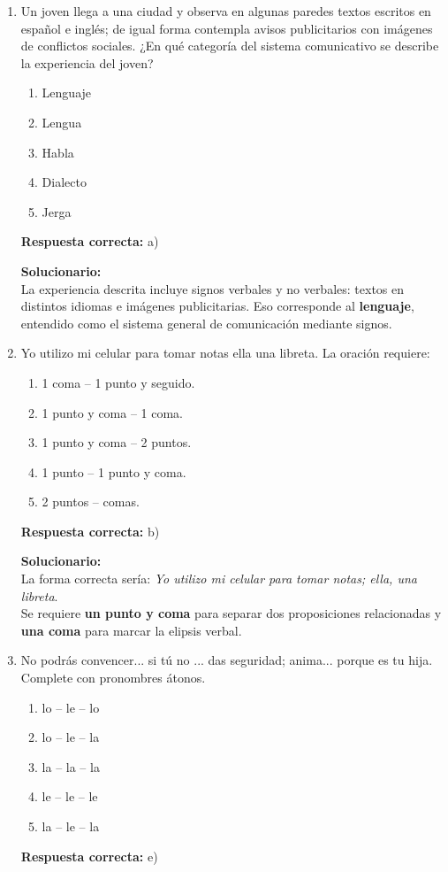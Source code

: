 \begin{enumerate}
	
	\item Un joven llega a una ciudad y observa en algunas paredes textos escritos en español e inglés; de igual forma contempla avisos publicitarios con imágenes de conflictos sociales. ¿En qué categoría del sistema comunicativo se describe la experiencia del joven?
	\begin{enumerate}[label=\alph*)]
		\item Lenguaje
		\item Lengua
		\item Habla
		\item Dialecto
		\item Jerga
	\end{enumerate}
	\textbf{Respuesta correcta:} a)
	
	\vspace{2mm}
	\textbf{Solucionario:}\\
	La experiencia descrita incluye signos verbales y no verbales: textos en distintos idiomas e imágenes publicitarias. Eso corresponde al \textbf{lenguaje}, entendido como el sistema general de comunicación mediante signos.
	
	\vspace{6mm}
	
	\item Yo utilizo mi celular para tomar notas ella una libreta. La oración requiere:
	\begin{enumerate}[label=\alph*)]
		\item 1 coma -- 1 punto y seguido.
		\item 1 punto y coma -- 1 coma.
		\item 1 punto y coma -- 2 puntos.
		\item 1 punto -- 1 punto y coma.
		\item 2 puntos -- comas.
	\end{enumerate}
	\textbf{Respuesta correcta:} b)
	
	\vspace{2mm}
	\textbf{Solucionario:}\\
	La forma correcta sería: \textit{Yo utilizo mi celular para tomar notas; ella, una libreta}.\\
	Se requiere \textbf{un punto y coma} para separar dos proposiciones relacionadas y \textbf{una coma} para marcar la elipsis verbal.
	
	\vspace{6mm}
	
	\item No podrás convencer... si tú no ... das seguridad; anima... porque es tu hija. Complete con pronombres átonos.
	\begin{enumerate}[label=\alph*)]
		\item lo -- le -- lo
		\item lo -- le -- la
		\item la -- la -- la
		\item le -- le -- le
		\item la -- le -- la
	\end{enumerate}
	\textbf{Respuesta correcta:} e)
	

\end{enumerate}
